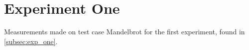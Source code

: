 \section{Experiment One}\label{app:exp_one}

Measurements made on test case Mandelbrot for the first experiment, found in \cref{subsec:exp_one}.

% 
% 
%

%
%
%

